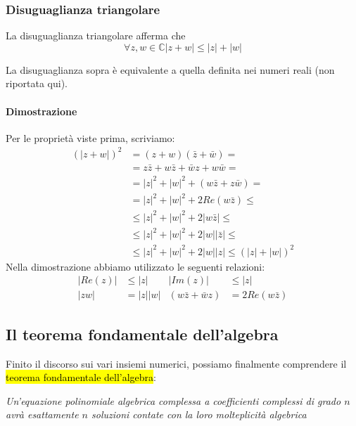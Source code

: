 \subsubsection{Disuguaglianza triangolare}
La disuguaglianza triangolare afferma che 
\[ \forall z,w \in \mathbb{C} |z + w| \leq |z| + |w| \]

La disuguaglianza sopra è equivalente a quella definita nei numeri reali (non
riportata qui).

\paragraph{Dimostrazione} Per le proprietà viste prima, scriviamo:
\begin{align*}
    (|z+w|)^2 &= (z+w)(\bar{z} + \bar{w}) = \\
        &= z\bar{z} + w\bar{z} + \bar{w}z + w\bar{w} = \\
        &= |z|^2 + |w|^2 + (w\bar{z} + z\bar{w}) = \\
        &= |z|^2 + |w|^2 + 2Re(w\bar{z}) \leq \\
        &\leq |z|^2 + |w|^2 + 2|w\bar{z}| \leq \\
        &\leq |z|^2 + |w|^2 + 2|w||\bar{z}| \leq \\
        &\leq |z|^2 + |w|^2 + 2|w||z| \leq (|z| + |w|)^2
\end{align*}
Nella dimostrazione abbiamo utilizzato le seguenti relazioni:
\begin{align*}
    |Re(z)| &\leq |z| & |Im(z)| &\leq |z| \\
    |zw| &= |z||w| & (w\bar{z} + \bar{w}z) &= 2Re(w\bar{z})
\end{align*}

\subsection{Il teorema fondamentale dell'algebra}
Finito il discorso sui vari insiemi numerici, possiamo finalmente comprendere
il \hl{teorema fondamentale dell'algebra}:
\begin{center}
\textit{Un'equazione polinomiale algebrica complessa a coefficienti complessi di
grado $n$ avrà esattamente $n$ soluzioni contate con la loro molteplicità algebrica}
\end{center}
